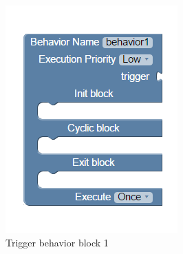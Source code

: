 \begin{figure}[H]
\begin{subfigure}[t]{0.33\textwidth}
\includegraphics[width=\textwidth]{../thesis/assets/blocks_behavior1.png}
\caption[Trigger behavior block 1]{Trigger behavior block 1}
\label{fig:trigger_block1}
\end{subfigure}
\begin{subfigure}[t]{0.33\textwidth}

\end{subfigure}
\end{figure}
